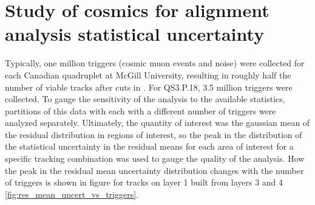 
\chapter[Analysis statistics]{Study of cosmics for alignment analysis statistical uncertainty}
\label{appendix:statistics}


Typically, one million triggers (cosmic muon events and noise) were collected for each Canadian quadruplet at McGill University, resulting in roughly half the number of viable tracks after cuts in . For QS3.P.18, 3.5 million triggers were collected. To gauge the sensitivity of the analysis to the available statistics, partitions of this data with each with a different number of triggers were analyzed separately. Ultimately, the quantity of interest was the gaussian mean of the residual distribution in regions of interest, so the peak in the distribution of the statistical uncertainty in the residual means for each area of interest for a specific tracking combination was used to gauge the quality of the analysis. How the peak in the residual mean uncertainty distribution changes with the number of triggers is shown in figure for tracks on layer 1 built from layers 3 and 4 \ref{fig:res_mean_uncert_vs_triggers}. 

